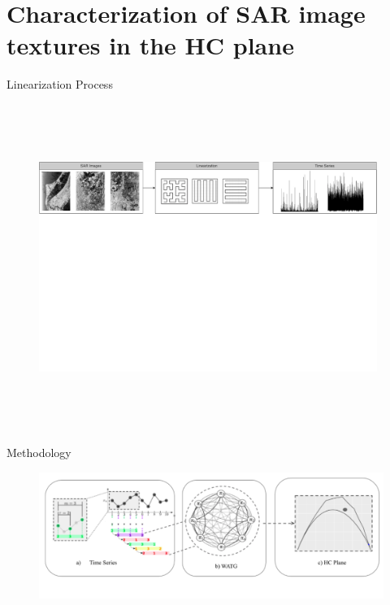 \documentclass[10pt]{beamer}
\begin{document}
\section{Characterization of SAR image textures in the HC plane}

\begin{frame}[fragile]{Linearization Process}
    
    \vspace{2cm}

    \begin{figure}
      \centering
       \includegraphics[width = 11cm,height = 10.6cm]{Figures/SAR.pdf}
    \end{figure}
    
\end{frame}

\begin{frame}[fragile]{Methodology}

    \begin{figure}
      \centering
       \includegraphics[scale = 0.4]{Figures/WATG.pdf}
    \end{figure}
    
\end{frame}

\maketitle
\end{document}
